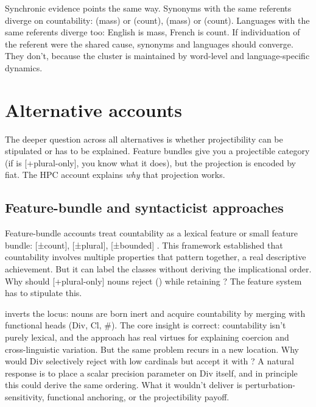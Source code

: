 \documentclass[12pt,a4paper]{article}
\begin{document}
Synchronic evidence points the same way. Synonyms with the same referents diverge on countability:  (mass) or  (count),  (mass) or  (count). Languages with the same referents diverge too: English  is mass, French  is count. If individuation of the referent were the shared cause, synonyms and languages should converge. They don't, because the cluster is maintained by word-level and language-specific dynamics.

\section{Alternative accounts}\label{sec:alternatives}

The deeper question across all alternatives is whether projectibility can be stipulated or has to be explained. Feature bundles give you a projectible category (if  is [+plural-only], you know what it does), but the projection is encoded by fiat. The HPC account explains \textit{why} that projection works.

\subsection{Feature-bundle and syntacticist approaches}

Feature-bundle accounts treat countability as a lexical feature or small feature bundle: [±count], [±plural], [±bounded] \citep{chomsky1965,allan1980}. This framework established that countability involves multiple properties that pattern together, a real descriptive achievement. But it can label the classes without deriving the implicational order. Why should [+plural-only] nouns reject () while retaining ? The feature system has to stipulate this.

\textcite{borer2005} inverts the locus: nouns are born inert and acquire countability by merging with functional heads (Div, Cl, \#). The core insight is correct: countability isn't purely lexical, and the approach has real virtues for explaining coercion and cross-linguistic variation. But the same problem recurs in a new location. Why would Div selectively reject  with low cardinals but accept it with ? A natural response is to place a scalar precision parameter on Div itself, and in principle this could derive the same ordering. What it wouldn't deliver is perturbation-sensitivity, functional anchoring, or the projectibility payoff.
\end{document}
